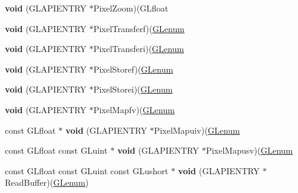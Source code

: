 \begin{DoxyCompactItemize}
{\bfseries void} (G\+L\+A\+P\+I\+E\+N\+T\+RY $\ast$Pixel\+Zoom)(G\+Lfloat
\item 
\mbox{\label{struct_____g_ldispatch_table_rec_a8335f0a951f41d59fdfe73299e68fc19}} 
{\bfseries void} (G\+L\+A\+P\+I\+E\+N\+T\+RY $\ast$Pixel\+Transferf)(\hyperlink{interfacevoid}{G\+Lenum}
\item 
\mbox{\label{struct_____g_ldispatch_table_rec_a1778694319ac9b1f6b853a041e1ac546}} 
{\bfseries void} (G\+L\+A\+P\+I\+E\+N\+T\+RY $\ast$Pixel\+Transferi)(\hyperlink{interfacevoid}{G\+Lenum}
\item 
\mbox{\label{struct_____g_ldispatch_table_rec_a629abf318e137435f157a0e28aa4fec0}} 
{\bfseries void} (G\+L\+A\+P\+I\+E\+N\+T\+RY $\ast$Pixel\+Storef)(\hyperlink{interfacevoid}{G\+Lenum}
\item 
\mbox{\label{struct_____g_ldispatch_table_rec_a0f010a3118e0ca9d8831e550a52f7e4b}} 
{\bfseries void} (G\+L\+A\+P\+I\+E\+N\+T\+RY $\ast$Pixel\+Storei)(\hyperlink{interfacevoid}{G\+Lenum}
\item 
\mbox{\label{struct_____g_ldispatch_table_rec_a7b23f91023328d48eda3919038ef89c3}} 
{\bfseries void} (G\+L\+A\+P\+I\+E\+N\+T\+RY $\ast$Pixel\+Mapfv)(\hyperlink{interfacevoid}{G\+Lenum}
\item 
\mbox{\label{struct_____g_ldispatch_table_rec_abd1821443fce3838baa30024011ccf68}} 
const G\+Lfloat $\ast$ {\bfseries void} (G\+L\+A\+P\+I\+E\+N\+T\+RY $\ast$Pixel\+Mapuiv)(\hyperlink{interfacevoid}{G\+Lenum}
\item 
\mbox{\label{struct_____g_ldispatch_table_rec_ac48108a433e05befc9268885b8c7df58}} 
const G\+Lfloat const G\+Luint $\ast$ {\bfseries void} (G\+L\+A\+P\+I\+E\+N\+T\+RY $\ast$Pixel\+Mapusv)(\hyperlink{interfacevoid}{G\+Lenum}
\item 
\mbox{\label{struct_____g_ldispatch_table_rec_aa78c5abe1de8cad013ab5c906bad5b21}} 
const G\+Lfloat const G\+Luint const G\+Lushort $\ast$ {\bfseries void} (G\+L\+A\+P\+I\+E\+N\+T\+RY $\ast$Read\+Buffer)(\hyperlink{interfacevoid}{G\+Lenum})

\end{DoxyCompactItemize}

